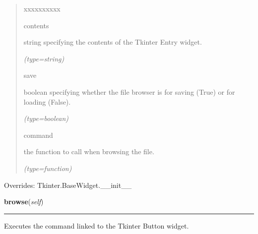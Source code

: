 \begin{boxedminipage}{\funcwidth}
\begin{quote}
\begin{Ventry}{xxxxxxxxxx}
          \item[contents]

          string specifying the contents of the Tkinter Entry widget.

            {\it (type=string)}

          \item[save]

          boolean specifying whether the file browser is for saving (True) 
          or for loading (False).

            {\it (type=boolean)}

          \item[command]

          the function to call when browsing the file.

            {\it (type=function)}

        \end{Ventry}

      \end{quote}

      Overrides: Tkinter.BaseWidget.\_\_init\_\_

    \end{boxedminipage}

    \label{nMOLDYN:GUI:Widgets:ComboFileBrowser:browse}

    \vspace{0.5ex}

\hspace{.8\funcindent}\begin{boxedminipage}{\funcwidth}

    \raggedright \textbf{browse}(\textit{self})

    \vspace{-1.5ex}

    \rule{\textwidth}{0.5\fboxrule}
\setlength{\parskip}{2ex}
    Executes the command linked to the Tkinter Button widget.

\setlength{\parskip}{1ex}
    \end{boxedminipage}

    \label{nMOLDYN:GUI:Widgets:ComboFileBrowser:getValue}

